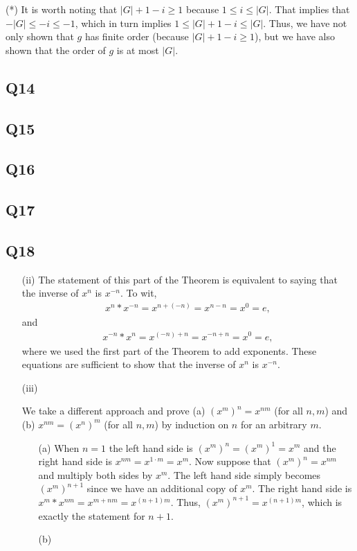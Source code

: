 \documentclass[12pt]{article}
\numberwithin{theorem}{section}
\numberwithin{equation}{section}
\numberwithin{remark}{section}
\numberwithin{definition}{section}
\numberwithin{theorem}{section}
\numberwithin{lemma}{section}
\numberwithin{example}{section}
\begin{document}
\vspace{\baselineskip}

\noindent (*) It is worth noting that $|G|+1-i\ge 1$ because $1\le i \le |G|$. That implies that $-|G| \le -i \le -1$, which in turn implies $1 \le |G|+1-i \le |G|$. Thus, we have not only shown that $g$ has finite order (because $|G|+1-i\ge 1$), but we have also shown that the order of $g$ is at most $|G|$.



\subsection{Q14}

\subsection{Q15}

\subsection{Q16}

\subsection{Q17}

\subsection{Q18}

\begin{itemize}
	\item[(ii)]{The statement of this part of the Theorem is equivalent to saying that the inverse of $x^n$ is $x^{-n}$. To wit,
	\begin{align*}
		x^n * x^{-n} = x^{n+(-n)}=x^{n-n}=x^0=e,
	\end{align*}
	and
	\begin{align*}
		x^{-n} * x^n = x^{(-n)+n}=x^{-n+n}=x^0=e,
	\end{align*}
	where we used the first part of the Theorem to add exponents. These equations are sufficient to show that the inverse of $x^n$ is $x^{-n}$.}
	\item[(iii)]{We take a different approach and prove (a) $(x^m)^n=x^{nm}$ (for all $n,m$) and (b) $x^{nm}=(x^n)^m$ (for all $n,m$) by induction on $n$ for an arbitrary $m$.
	\begin{itemize}
		\item[(a)]{When $n=1$ the left hand side is $(x^m)^n=(x^m)^1=x^m$ and the right hand side is $x^{nm}=x^{1\cdot m}=x^m$. Now suppose that $(x^m)^n=x^{nm}$ and multiply both sides by $x^m$. The left hand side simply becomes $(x^m)^{n+1}$ since we have an additional copy of $x^m$. The right hand side is $x^m*x^{nm}=x^{m+nm}=x^{(n+1)m}$. Thus, $(x^m)^{n+1}=x^{(n+1)m}$, which is exactly the statement for $n+1$.}
		\item[(b)]{}
	\end{itemize}}
\end{itemize}
\end{document}
